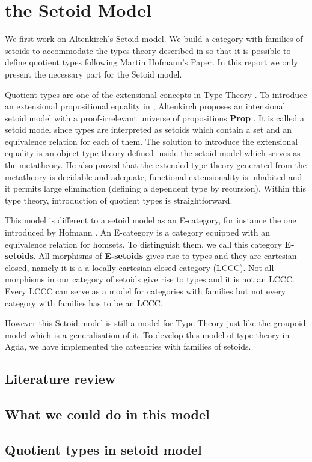 \chapter{the Setoid Model}




We first work on Altenkirch's Setoid model. We build a category
with families of setoids to accommodate the types theory described in
\cite{alti:lics99}  so that it is possible to define quotient types
following Martin Hofmann's Paper\cite{hof:95:sm}.  In this report we
only present the
necessary part for the Setoid model.



Quotient types are one of the extensional concepts in Type Theory \cite{hof:phd}. To introduce an extensional propositional equality in \itt{}, 
Altenkirch \cite{alti:lics99} proposes an intensional setoid model with a proof-irrelevant universe of
propositions \textbf{Prop} . It is called a setoid model since types are interpreted as setoids which contain a set and an equivalence relation for each of them.
The solution to introduce the extensional equality is an object type theory defined inside the setoid model which serves as the metatheory. He also proved that the extended type theory generated from the metatheory is decidable and adequate, functional extensionality is
inhabited and it permits large elimination (defining a dependent type by recursion). Within this type theory,
introduction of quotient types is straightforward.

This model is different to a setoid model as an E-category, for instance
the one introduced by Hofmann \cite{hofmann1995interpretation} . An E-category is a category equipped with
an equivalence relation for homsets. To distinguish them, we call this
category \textbf{E-setoids}.  All morphisms of \textbf{E-setoids}
gives rise to types and they are cartesian closed, namely it is a a locally
cartesian closed category (LCCC). Not all morphisms in our category of setoids give
rise to types and it is not an LCCC. Every LCCC can serve as a model for categories with
families but not every category with families has to be an
LCCC. 

However this Setoid model is still a model for Type
Theory just like the groupoid model which is a generalisation of it.
To develop this model of type theory in Agda, we have implemented the categories with families of setoids.


\section{Literature review}



\section{What we could do in this model}


\section{Quotient types in setoid model}

